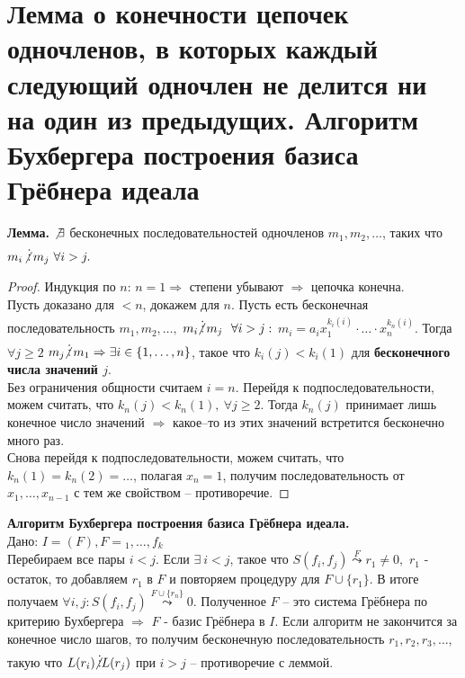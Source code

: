 \section{Лемма о конечности цепочек одночленов, в которых каждый следующий одночлен не делится ни на один из предыдущих. Алгоритм Бухбергера построения базиса Грёбнера идеала}

\textbf{Лемма.} $\not\exists$ бесконечных последовательностей одночленов $m_1, m_2, \dotsc$, таких что $m_i\!\not\vdots\, m_j\ \forall i > j.$
\begin{proof}
    Индукция по $n$: $n=1 \Rightarrow$ степени убывают $\Rightarrow$ цепочка конечна.\\
    Пусть доказано для $<n$, докажем для $n$. Пусть есть бесконечная последовательность $m_1, m_2, \dotsc,$ $m_i \!\!\not\vdots\, m_j\ \ \forall i > j:$ $m_i = a_i x_1^{k_i(i)}\cdot \dotsc \cdot x_n^{k_n(i)}$.
    Тогда $\forall j \geq 2$ $m_j \!\!\not\vdots\, m_1 \Rightarrow \exists i \in \{1, \dotsc, n\}$, такое что $k_i(j) < k_i(1)$ для \textbf{бесконечного числа значений $j$}. 
    \\Без ограничения общности считаем $i = n$. Перейдя к подпоследовательности, можем считать, что $k_n(j) < k_n(1), \ \forall j \geq 2$. Тогда $k_n(j)$ принимает лишь конечное число значений $\Rightarrow$ какое--то из этих значений встретится бесконечно много раз. 
    \\Снова перейдя к подпоследовательности, можем считать, что $k_n(1) = k_n(2) = \dotsc$, полагая $x_n = 1$, получим последовательность от $x_1, \dots, x_{n-1}$ с тем же свойством  -- противоречие.
\end{proof}
\noindent\textbf{Алгоритм Бухбергера построения базиса Грёбнера идеала.}
\\Дано: $I = (F), F={_1, \dotsc, f_k}$\\
Перебираем все пары $i < j$. Если  $\exists\ i < j$, такое что $S(f_i, f_j) \overset{F}{\leadsto} r_1 \neq 0,$ $r_1$ - остаток, то добавляем $r_1$ в $F$ и повторяем процедуру для $F \cup \{r_1\}$. В итоге получаем $\forall i, j: S(f_i, f_j) \overset{F \cup \{r_n\}}{\leadsto} 0$. Полученное $F$ -- это система Грёбнера по критерию Бухбергера $\Rightarrow$ $F$ - базис Грёбнера в $I$. Если алгоритм не закончится за конечное число шагов, то получим бесконечную последовательность $r_1, r_2, r_3, \dotsc$, такую что $L(r_i) \!\!\not\vdots L(r_j)$ при $i > j$ -- противоречие с леммой.